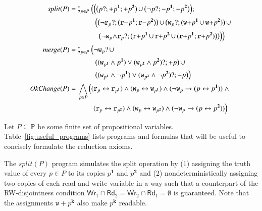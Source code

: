\documentclass{llncs}
\newcommand{\cp}[2]{{#2}^\mathbf{#1}}
\newcommand{\readable}[1]{\mathtt{r}_{#1}}
\newcommand{\readset}{\mathsf{Rd}}
\newcommand{\writable}[1]{\mathtt{w}_{#1}}
\newcommand{\writeset}{\mathsf{Wr}}
\newcommand{\testpdl}{?}				%
\newcommand{\assgntopR}[1]{{\mathtt r {+} #1}}
\newcommand{\assgnbotR}[1]{{\mathtt r {-} #1}}
\newcommand{\assgntopW}[1]{{\mathtt w {+} #1}}
\newcommand{\assgntopV}[1]{{\mathtt {+} #1}}
\newcommand{\assgnbotV}[1]{{\mathtt {-} #1}}
\newcommand{\leqv}{ \leftrightarrow }
\newcommand{\limp}{ \rightarrow }
\newcommand{\ndet}{\,{\cup}\,}
\newcommand{\propset}{\mathbb P}
\newcommand{\seqseq}[1]{ \text{\Large ;}_{#1} ~ }
\newcommand{\set}[1]{\{#1\}}
\begin{document}
\begin{table}[t]
\begin{align*}
\mathit{split}(P) =&\ \seqseq{p \in P} \Big( 
\Big(
  \big( p \testpdl ; \assgntopV{ \cp{1}{p} } ; \assgntopV{ \cp{2}{p} } \big) \ndet 
  \big( \lnot p \testpdl ; \assgnbotV{ \cp{1}{p} } ; \assgnbotV{ \cp{2}{p} } \big) 
\Big) ;
\\& ~~~~~~~~~~~
\Big(
  \big(\lnot \readable p  \testpdl ; \big( \assgnbotR{\cp 1 {p}} ; \assgnbotR{\cp 2 {p}} \big) \big) \ndet
  \big(\writable{p} \testpdl ; ( \assgntopW{\cp 1 {p}} \ndet \assgntopW{\cp 2 {p}} ) \big) 			 \ndet
  \\& ~~~~~~~~~~~~~
  \big(\lnot \writable{p} {\land} \readable p  \testpdl ; \big( \assgntopR{\cp 1 {p}} \ndet \assgntopR{\cp 2 {p}} \ndet 
																			  (\assgntopR{\cp 1 {p}}  ; \assgntopR{\cp 2 {p}}) \big) \big) 
\Big)
\Big)
\\
\mathit{merge}(P) =&\ \seqseq{p \in P} \Big( 
\lnot \writable{p} \testpdl \ndet 
\\& ~~~~~~~~~~~ 
\big(	(\writable{ \cp{1}{p} } \land \cp{1}{p}) \lor 
		(\writable{ \cp{2}{p} } \land \cp{2}{p}) \testpdl ; \assgntopV p \big) \ndet 
\\& ~~~~~~~~~~~ 
\big(	(\writable{ \cp{1}{p} } \land \lnot \cp{1}{p}) \lor 
		(\writable{ \cp{2}{p} } \land \lnot \cp{2}{p}) \testpdl ; \assgnbotV p \big) 
\Big)
\\
\mathit{OkChange}(P) =&\ \bigwedge_{p \in P} \Big(
( \readable{p} \leqv \readable{ \cp 1 {p} } ) 	\land 
( \writable{p} \leqv \writable{ \cp 1 {p} } ) 	\land 	
( \lnot \writable{p} \limp (p \leqv \cp 1 {p}) ) \ \land
\\& ~~~~~~~~~~ 
( \readable{p} \leqv \readable{ \cp 2 {p} } ) 	\land 
( \writable{p} \leqv \writable{ \cp 2 {p} } ) 	\land 	
( \lnot \writable{p} \limp (p \leqv \cp 2 {p}) ) 
\Big)
\end{align*}
\caption{Useful programs, for $P \subseteq \propset$ %
\label{fig:useful_programs}
}
\end{table}

Let $P \subseteq \propset$ be some finite set of propositional variables. 
Table~\ref{fig:useful_programs} lists programs and formulas that will be useful to concisely formulate the reduction axioms.

The $\mathit{split}(P)$ program simulates the split operation by 
(1) assigning the truth value of every $p \in P$ to its copies $\cp 1 p$ and $\cp 2 p$ and
(2) nondeterministically assigning
two copies of each read and write variable in a way such that a counterpart of the RW-disjointness condition
$\writeset_1 \cap \readset_2 = \writeset_2 \cap \readset_1 = \emptyset$ is guaranteed.  
Note that the assignments $\assgntopW{ \cp{k}{p} }$ also make $\cp{k}{p} $ readable.
\end{document}
